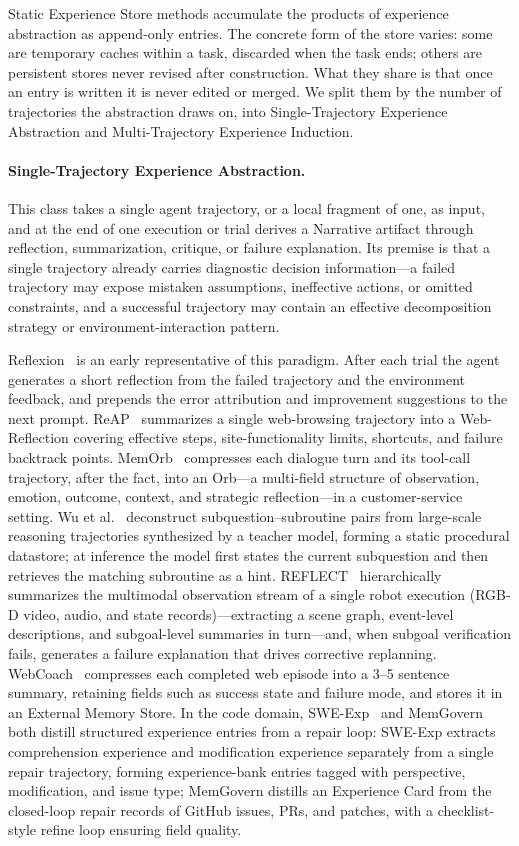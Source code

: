 Static Experience Store methods accumulate the products of experience abstraction as append-only entries. The concrete form of the store varies: some are temporary caches within a task, discarded when the task ends; others are persistent stores never revised after construction. What they share is that once an entry is written it is never edited or merged. We split them by the number of trajectories the abstraction draws on, into Single-Trajectory Experience Abstraction and Multi-Trajectory Experience Induction.

\paragraph{Single-Trajectory Experience Abstraction.} This class takes a single agent trajectory, or a local fragment of one, as input, and at the end of one execution or trial derives a Narrative artifact through reflection, summarization, critique, or failure explanation. Its premise is that a single trajectory already carries diagnostic decision information---a failed trajectory may expose mistaken assumptions, ineffective actions, or omitted constraints, and a successful trajectory may contain an effective decomposition strategy or environment-interaction pattern.

Reflexion~\cite{Shi23b} is an early representative of this paradigm. After each trial the agent generates a short reflection from the failed trajectory and the environment feedback, and prepends the error attribution and improvement suggestions to the next prompt. ReAP~\cite{Aza25} summarizes a single web-browsing trajectory into a Web-Reflection covering effective steps, site-functionality limits, shortcuts, and failure backtrack points. MemOrb~\cite{Hua25} compresses each dialogue turn and its tool-call trajectory, after the fact, into an Orb---a multi-field structure of observation, emotion, outcome, context, and strategic reflection---in a customer-service setting. Wu et al.~\cite{Wu26} deconstruct subquestion--subroutine pairs from large-scale reasoning trajectories synthesized by a teacher model, forming a static procedural datastore; at inference the model first states the current subquestion and then retrieves the matching subroutine as a hint. REFLECT~\cite{Liu23} hierarchically summarizes the multimodal observation stream of a single robot execution (RGB-D video, audio, and state records)---extracting a scene graph, event-level descriptions, and subgoal-level summaries in turn---and, when subgoal verification fails, generates a failure explanation that drives corrective replanning. WebCoach~\cite{Liu25e} compresses each completed web episode into a 3--5 sentence summary, retaining fields such as success state and failure mode, and stores it in an External Memory Store. In the code domain, SWE-Exp~\cite{Che25d} and MemGovern~\cite{Wan26ap} both distill structured experience entries from a repair loop: SWE-Exp extracts comprehension experience and modification experience separately from a single repair trajectory, forming experience-bank entries tagged with perspective, modification, and issue type; MemGovern distills an Experience Card from the closed-loop repair records of GitHub issues, PRs, and patches, with a checklist-style refine loop ensuring field quality.

